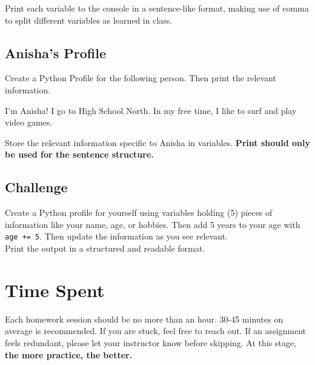 \documentclass{article}
\begin{document}
Print each variable to the console in a sentence-like format, making use of comma to split different variables as learned in class.

\subsection{Anisha's Profile}

Create a Python Profile for the following person. Then print the relevant information.

\begin{center}
    I'm Anisha! I go to High School North. In my free time, I like to surf and play video games.
\end{center}

Store the relevant information specific to Anisha in variables. \textbf{Print should only be used for the sentence structure.}

\subsection{Challenge}

Create a Python profile for yourself using variables holding (5) pieces of information like your name, age, or hobbies. Then add 5 years to your age with \verb|age += 5|. Then update the information as you see relevant. \\ 

Print the output in a structured and readable format. 

\section{Time Spent}

Each homework session should be no more than an hour. 30-45 minutes on average is recommended. If you are stuck, feel free to reach out. If an assignment feels redundant, please let your instructor know before skipping. At this stage, \textbf{the more practice, the better.}
\end{document}
